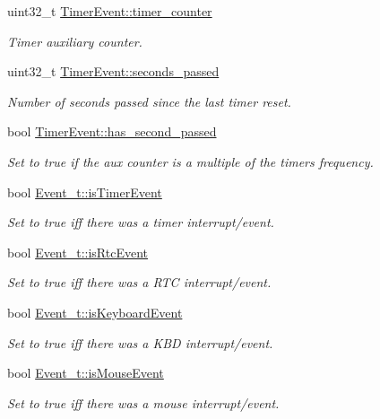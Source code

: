 \begin{DoxyCompactItemize}
uint32\+\_\+t \mbox{\hyperlink{group__event_ga9172712556eddc4759318d2b2c527c6a}{Timer\+Event\+::timer\+\_\+counter}}
\begin{DoxyCompactList}\small\item\em Timer auxiliary counter. \end{DoxyCompactList}\item 
uint32\+\_\+t \mbox{\hyperlink{group__event_gafb71fa98ff8d281a1007a43b7235bf6e}{Timer\+Event\+::seconds\+\_\+passed}}
\begin{DoxyCompactList}\small\item\em Number of seconds passed since the last timer reset. \end{DoxyCompactList}\item 
bool \mbox{\hyperlink{group__event_ga5cc6e66bde06d7bbd60a5205f91969ab}{Timer\+Event\+::has\+\_\+second\+\_\+passed}}
\begin{DoxyCompactList}\small\item\em Set to true if the aux counter is a multiple of the timer\textquotesingle{}s frequency. \end{DoxyCompactList}\item 
bool \mbox{\hyperlink{group__event_ga9ed8eea2d6d0593ed3dd328c0d39cff4}{Event\+\_\+t\+::is\+Timer\+Event}}
\begin{DoxyCompactList}\small\item\em Set to true iff there was a timer interrupt/event. \end{DoxyCompactList}\item 
bool \mbox{\hyperlink{group__event_ga8161d752a03a628ed75607ba51dcf534}{Event\+\_\+t\+::is\+Rtc\+Event}}
\begin{DoxyCompactList}\small\item\em Set to true iff there was a R\+TC interrupt/event. \end{DoxyCompactList}\item 
bool \mbox{\hyperlink{group__event_ga7a5c0340c7ca96d9e3b888d9adeb7953}{Event\+\_\+t\+::is\+Keyboard\+Event}}
\begin{DoxyCompactList}\small\item\em Set to true iff there was a K\+BD interrupt/event. \end{DoxyCompactList}\item 
bool \mbox{\hyperlink{group__event_gad4c9f151571424b2fbf072c61a6b8d49}{Event\+\_\+t\+::is\+Mouse\+Event}}
\begin{DoxyCompactList}\small\item\em Set to true iff there was a mouse interrupt/event. \end{DoxyCompactList}\item 

\end{DoxyCompactItemize}
